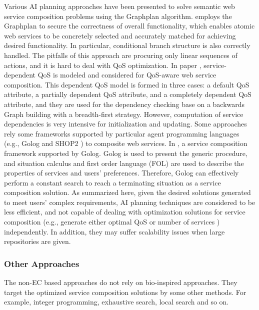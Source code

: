 Various AI planning approaches \cite{feng2013dynamic,huang2009effective,rao2006mixed,wang2013genetic, wang2014automated} have been presented to solve semantic web service composition problems using the Graphplan \cite{blum1997fast} algorithm. \cite{wang2014automated} employs the Graphplan to secure the correctness of overall functionality, which enables atomic web services to be concretely selected and accurately matched for achieving desired functionality. In particular, conditional branch structure is also correctly handled. The pitfalls of this approach are procuring only linear sequences of actions, and it is hard to deal with QoS optimization. In paper \cite{feng2013dynamic}, service-dependent QoS is modeled and considered for QoS-aware web service composition. This dependent QoS model is formed in three cases: a default QoS attribute, a partially dependent QoS attribute, and a completely dependent QoS attribute, and they are used for the dependency checking base on a backwards Graph building with a breadth-first strategy. However, computation of service dependencies is very intensive for initialization and updating. Some approaches \cite{lecue2007making,sohrabi2009web} rely some frameworks supported by particular agent programming languages (e.g., Golog \cite{sohrabi2009web}  and SHOP2 \cite{sirin2004htn}) to composite web services. In \cite{sohrabi2009web}, a service composition framework supported by Golog. Golog is used to present the generic procedure, and situation calculus and first order language (FOL) are used to describe the properties of services and users' preferences. Therefore, Golog can effectively perform a constant search to reach a terminating situation as a service composition solution. As summarized here, given the desired solutions generated to meet users' complex requirements, AI planning techniques are considered to be less efficient, and not capable of dealing with optimization solutions for service composition (e.g., generate either optimal QoS or number of services ) independently. In addition, they may suffer scalability issues when large repositories are given. 

\subsubsection{Other Approaches}
The non-EC based approaches do not rely on bio-inspired approaches. They target the optimized service composition solutions by some other methods. For example, integer programming, exhaustive search, local search and so on.

